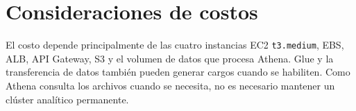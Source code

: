 ﻿\chapter{Consideraciones de costos}
El costo depende principalmente de las cuatro instancias EC2 \texttt{t3.medium}, EBS, ALB, API Gateway, S3 y el volumen de datos que procesa Athena. Glue y la transferencia de datos también pueden generar cargos cuando se habiliten. Como Athena consulta los archivos cuando se necesita, no es necesario mantener un clúster analítico permanente.
